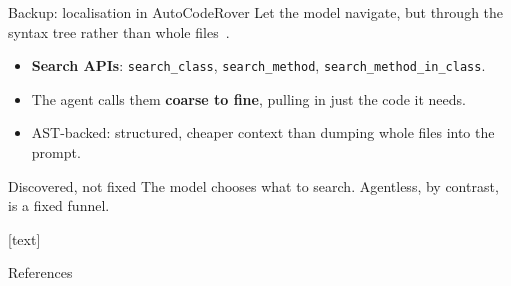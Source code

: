 \documentclass[
  aspectratio=169,
  font=times,
  sectionpage=true,
]{tumbeamer}
\begin{document}
\begin{frame}[noframenumbering]{Backup: localisation in AutoCodeRover}
  {\small Let the model navigate, but through the syntax tree rather than whole
  files~\cite{zhang2024autocoderover}.}

  \bigskip
  \begin{itemize}
    \item \textbf{Search APIs}: \texttt{search\_class},
      \texttt{search\_method}, \texttt{search\_method\_in\_class}.
      \medskip
    \item The agent calls them \textbf{coarse to fine}, pulling in just the code
      it needs.
      \medskip
    \item AST-backed: structured, cheaper context than dumping whole files into
      the prompt.
  \end{itemize}

  \bigskip
  \begin{block}{Discovered, not fixed}
    The model chooses what to search. Agentless, by contrast, is a fixed
    funnel.
  \end{block}
\end{frame}

[text]


\makeatletter
\let\beamer@oldthebibliography\thebibliography
\renewcommand{\thebibliography}[1]{%
  \beamer@oldthebibliography{#1}%
  \setlength{\itemsep}{0pt}%
  \setlength{\parsep}{0pt}%
  \setlength{\topsep}{0pt}%
}
\makeatother

\begin{frame}{References}
  \tiny
  
  
\end{frame}
\end{document}
